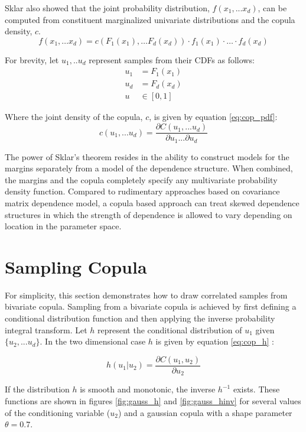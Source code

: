 Sklar also showed that the joint probability distribution, $f(x_1, ... x_d)$, can be computed from
constituent marginalized univariate distributions and the copula density, $c$.
\begin{equation}
f(x_1,\dots x_d)= c(F_1(x_1),\dots F_d(x_d))\cdot f_1(x_1)\cdot\dots\cdot f_d(x_d)
\label{eq:sklar2}
\end{equation}

For brevity, let $u_1, .. u_d$ represent samples from their CDFs as follows:
\begin{align*} u_1 &= F_1(x_1) \\ u_d &= F_d(x_d) \\ u &\in
[0, 1]
\end{align*}

Where the joint density of the copula, $c$, is given by equation \ref{eq:cop_pdf}:
\begin{equation}
c(u_1, ... u_d) = \frac{\partial C(u_1, ... u_d)}{\partial u_1 ... \partial u_d}
\label{eq:cop_pdf}
\end{equation}

The power of Sklar's theorem resides in the ability to construct
models for the margins separately from a model of the dependence structure.
When combined, the margins and the copula completely
specify any multivariate probability density function.
Compared to rudimentary approaches based on covariance matrix dependence model,
a copula based approach can treat skewed dependence structures in which the
strength of dependence is allowed to vary depending on location in the parameter space.

\section*{Sampling Copula}

For simplicity, this section demonstrates how to draw correlated samples from bivariate copula.
Sampling from a bivariate copula is achieved by first defining a conditional distribution function and then applying the inverse probability integral transform.
Let $h$ represent the conditional distribution of $u_1$ given $\{u_2, ... u_d\}$.  In the two dimensional case $h$ is given by equation \ref{eq:cop_h} \cite{Nelsen2006}:

\begin{equation}
h(u_1 | u_2) = \frac{\partial C(u_1, u_2)}{\partial u_2}
\label{eq:cop_h}
\end{equation}

If the distribution $h$ is smooth and monotonic, the inverse $h^{-1}$ exists.  These functions are shown in figures \ref{fig:gauss_h} and \ref{fig:gauss_hinv} for several values of the conditioning variable ($u_2$) and a gaussian copula with a shape parameter $\theta=0.7$.  

